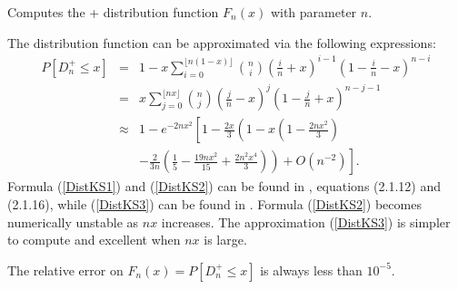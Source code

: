 \begin{tabb}
  Computes the \ks+ distribution function $F_n(x)$  with parameter $n$.
  \begin{latexonly}%
  The distribution function can be approximated via the
  following expressions:
  \begin {eqnarray}
   P[D_n^+ \le x]
    &=& 1 - x \sum_{i=0}^{\lfloor n(1-x)\rfloor}  \binom{n}{i}
        \left(\frac{i}{n} + x \right)^{i-1}
        \left(1 - \frac{i}{n} - x \right)^{n-i}     \label {DistKS1} \\[4pt]
    &=& x \sum_{j=0}^{\lfloor nx \rfloor}
        \binom{n}{j} \left(\frac{j}{n} - x \right)^j
        \left(1 - \frac{j}{n} + x \right)^{n-j-1}   \label {DistKS2} \\[4pt]
    &\approx& 1 - e^{-2 n x^2} \left[1 - \frac{2x}{3} \left(
           1 - x\left(1 - \frac{2 n x^2}{3}\right) \right.\right.
                                                   \nonumber\\[4pt]
    &&  \left.\left. - \frac{2}{3n} \left(\frac{1}{5} - \frac{19 n x^2}{15}
              + \frac{2n^2 x^4}{3}\right) \right) + O(n^{-2}) \right].
                                                   \label {DistKS3}
  \end {eqnarray}
  Formula (\ref{DistKS1}) and (\ref{DistKS2}) can be found in
  \cite{tDUR73a}, equations (2.1.12) and (2.1.16), while (\ref{DistKS3})
  can be found in \cite{tDAR60a}.
  Formula (\ref{DistKS2}) becomes numerically unstable as $nx$ increases.
  The approximation (\ref{DistKS3}) is simpler to compute and excellent
  when  $nx$ is large.
\end{latexonly}%
  The relative  error on $F_n(x) = P[D_n^+ \le x]$ is always less than
  $10^{-5}$. %
\end{tabb}
